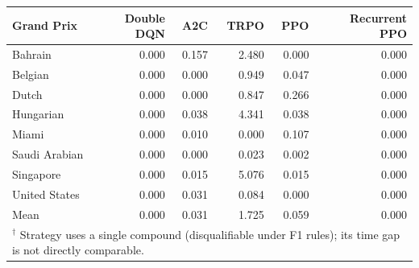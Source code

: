 \begin{tabular}{lrrrrr}
\toprule
Grand Prix & Double DQN & A2C & TRPO & PPO & Recurrent PPO \\
\midrule
Bahrain & 0.000 & 0.157 & 2.480 & 0.000 & 0.000 \\
Belgian & 0.000 & 0.000 & 0.949 & 0.047 & 0.000 \\
Dutch & 0.000 & 0.000 & 0.847 & 0.266 & 0.000 \\
Hungarian & 0.000 & 0.038 & 4.341 & 0.038 & 0.000 \\
Miami & 0.000 & 0.010 & 0.000 & 0.107 & 0.000 \\
Saudi Arabian & 0.000 & 0.000 & 0.023 & 0.002 & 0.000 \\
Singapore & 0.000 & 0.015 & 5.076 & 0.015 & 0.000 \\
United States & 0.000 & 0.031 & 0.084 & 0.000 & 0.000 \\
\midrule
Mean & 0.000 & 0.031 & 1.725 & 0.059 & 0.000 \\
\bottomrule
\multicolumn{6}{l}{\footnotesize $^\dagger$ Strategy uses a single compound (disqualifiable under F1 rules); its time gap is not directly comparable.} \\
\end{tabular}